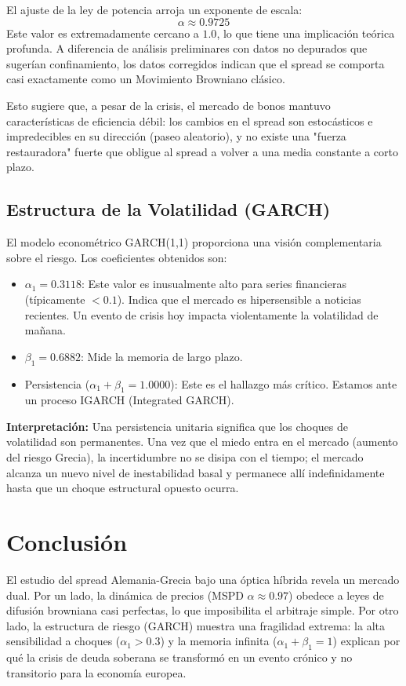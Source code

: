 \documentclass[a4paper,12pt]{article}
\begin{document}
El ajuste de la ley de potencia arroja un exponente de escala:
\begin{equation*}
    \alpha \approx 0.9725
\end{equation*}
Este valor es extremadamente cercano a $1.0$, lo que tiene una implicación teórica profunda. A diferencia de análisis preliminares con datos no depurados que sugerían confinamiento, los datos corregidos indican que el spread se comporta casi exactamente como un Movimiento Browniano clásico.

Esto sugiere que, a pesar de la crisis, el mercado de bonos mantuvo características de eficiencia débil: los cambios en el spread son estocásticos e impredecibles en su dirección (paseo aleatorio), y no existe una "fuerza restauradora" fuerte que obligue al spread a volver a una media constante a corto plazo.

\subsection{Estructura de la Volatilidad (GARCH)}
El modelo econométrico GARCH(1,1) proporciona una visión complementaria sobre el riesgo. Los coeficientes obtenidos son:
\begin{itemize}
    \item $\alpha_1 = 0.3118$: Este valor es inusualmente alto para series financieras (típicamente $< 0.1$). Indica que el mercado es hipersensible a noticias recientes. Un evento de crisis hoy impacta violentamente la volatilidad de mañana.
    \item $\beta_1 = 0.6882$: Mide la memoria de largo plazo.
    \item Persistencia ($\alpha_1 + \beta_1 = 1.0000$): Este es el hallazgo más crítico. Estamos ante un proceso IGARCH (Integrated GARCH).
\end{itemize}

\textbf{Interpretación:} Una persistencia unitaria significa que los choques de volatilidad son permanentes. Una vez que el miedo entra en el mercado (aumento del riesgo Grecia), la incertidumbre no se disipa con el tiempo; el mercado alcanza un nuevo nivel de inestabilidad basal y permanece allí indefinidamente hasta que un choque estructural opuesto ocurra.

\section{Conclusión}

El estudio del spread Alemania-Grecia bajo una óptica híbrida revela un mercado dual. Por un lado, la dinámica de precios (MSPD $\alpha \approx 0.97$) obedece a leyes de difusión browniana casi perfectas, lo que imposibilita el arbitraje simple. Por otro lado, la estructura de riesgo (GARCH) muestra una fragilidad extrema: la alta sensibilidad a choques ($\alpha_1 > 0.3$) y la memoria infinita ($\alpha_1+\beta_1=1$) explican por qué la crisis de deuda soberana se transformó en un evento crónico y no transitorio para la economía europea.
\end{document}
